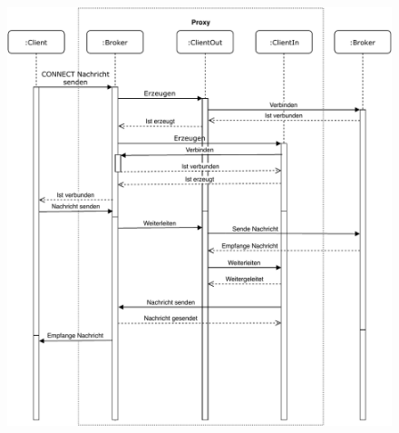     \begin{figure}[h]%
        \centering
        \includegraphics[width=12cm]{tex/bilder/4_konzept/Sequenz.pdf}
        \label{fig:system_frontend}
    \end{figure}
